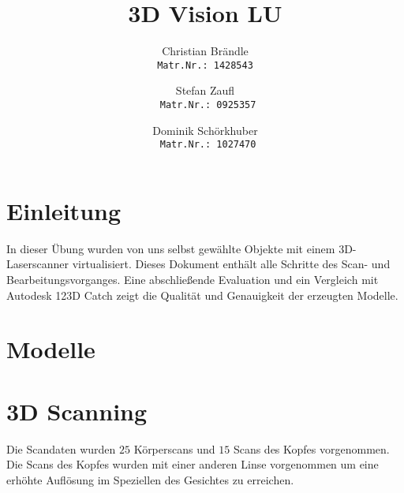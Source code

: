 \documentclass[]{article}
\title{3D Vision LU}
\author{Christian Br\"andle \\
\texttt{Matr.Nr.: 1428543}
\and Stefan Zaufl \\
\texttt{ Matr.Nr.: 0925357}
\and Dominik Sch\"orkhuber\\
\texttt{ Matr.Nr.: 1027470}}
\begin{document}
\maketitle


\section{Einleitung}  %
In dieser Übung wurden von uns selbst gewählte Objekte mit einem 3D-Laserscanner virtualisiert. Dieses Dokument enthält alle Schritte des Scan- und Bearbeitungsvorganges. Eine abschließende Evaluation und ein Vergleich mit Autodesk 123D Catch zeigt die Qualität und Genauigkeit der erzeugten Modelle. 

\section{Modelle}
\subsection{}
\subsection{}
\subsection{}

\section{3D Scanning} %

Die Scandaten wurden $25$ Körperscans und $15$ Scans des Kopfes vorgenommen.
Die Scans des Kopfes wurden mit einer anderen Linse vorgenommen um eine erhöhte Auflösung im Speziellen des Gesichtes zu erreichen.

\subsection{}
\subsection{}
\subsection{}
\end{document}
